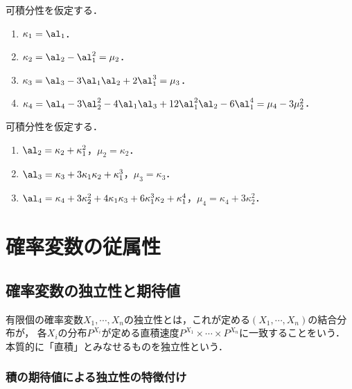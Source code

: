 \documentclass[uplatex,dvipdfmx]{jsreport}
\begin{document}
\begin{corollary}
    可積分性を仮定する．
    \begin{enumerate}
        \item $\kappa_1=\al_1$．
        \item $\kappa_2=\al_2-\al_1^2=\mu_2$．
        \item $\kappa_3=\al_3-3\al_1\al_2+2\al_1^3=\mu_3$．
        \item $\kappa_4=\al_4-3\al_2^2-4\al_1\al_3+12\al_1^2\al_2-6\al_1^4=\mu_4-3\mu_2^2$．
    \end{enumerate}
\end{corollary}

\begin{corollary}[積率・中心積率のキュムラントによる表現]
    可積分性を仮定する．
    \begin{enumerate}
        \item $\al_2=\kappa_2+\kappa_1^2$，$\mu_2=\kappa_2$．
        \item $\al_3=\kappa_3+3\kappa_1\kappa_2+\kappa^3_1$，$\mu_3=\kappa_3$．
        \item $\al_4=\kappa_4+3\kappa_2^2+4\kappa_1\kappa_3+6\kappa_1^3\kappa_2+\kappa^4_1$，$\mu_4=\kappa_4+3\kappa_2^2$．
    \end{enumerate}
\end{corollary}

\chapter{確率変数の従属性}

\section{確率変数の独立性と期待値}

\begin{tcolorbox}[colframe=ForestGreen, colback=ForestGreen!10!white,breakable,colbacktitle=ForestGreen!40!white,coltitle=black,fonttitle=\bfseries\sffamily,
title=]
    有限個の確率変数$X_1,\cdots,X_n$の独立性とは，これが定める$(X_1,\cdots,X_n)$の結合分布が，
    各$X_i$の分布$P^{X_i}$が定める直積速度$P^{X_1}\times\cdots\times P^{X_n}$に一致することをいう．
    本質的に「直積」とみなせるものを独立性という．
\end{tcolorbox}

\subsection{積の期待値による独立性の特徴付け}
\end{document}
